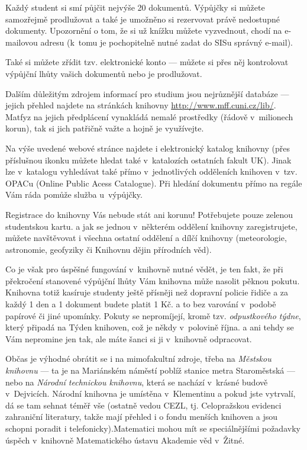 Každý student si smí půjčit nejvýše 20 dokumentů. Výpůjčky si
můžete samozřejmě prodlužovat a také je umožněno si rezervovat
právě nedostupné dokumenty. Upozornění o tom, že si už knížku
můžete vyzvednout, chodí na e-mailovou adresu (k~tomu je
pochopitelně nutné zadat do SISu správný e-mail).

Také si můžete zřídit tzv. elektronické konto --- můžete si přes
něj kontrolovat výpůjční lhůty vašich dokumentů nebo je
prodlužovat.

Dalším důležitým zdrojem informací pro studium jsou nejrůznější
databáze --- jejich přehled najdete na stránkách knihovny \url{http://www.mff.cuni.cz/lib/}. Matfyz na jejich předplácení
vynakládá nemalé prostředky (řádově v~milionech korun), tak si
jich patřičně važte a hojně je využívejte.

Na výše uvedené webové stránce najdete i elektronický katalog
knihovny (přes příslušnou ikonku můžete hledat také v~katalozích
ostatních fakult UK). Jinak lze v~katalogu vyhledávat také přímo
v~jednotlivých odděleních knihoven v~tzv. OPACu (Online Public Acess
Catalogue). Při hledání dokumentu přímo na regále Vám ráda pomůže
služba u~výpůjčky.

Registrace do knihovny Vás nebude stát ani korunu! Potřebujete
pouze zelenou studentskou kartu. a jak se jednou v~některém
oddělení knihovny zaregistrujete, můžete navštěvovat i všechna
ostatní oddělení a dílčí knihovny (meteorologie, astronomie,
geofyziky či Knihovnu dějin přírodních věd).

Co je však pro úspěšné fungování v~knihovně nutné vědět, je ten
fakt, že při překročení stanovené výpůjční lhůty Vám knihovna může
nasolit pěknou pokutu. Knihovna totiž kasíruje studenty ještě
přísněji než dopravní policie řidiče a za každý 1 den a 1 dokument
budete platit 1 Kč. a to bez varování v~podobě papírové či jiné
upomínky. Pokuty se nepromíjejí, kromě tzv. {\it odpustkového
týdne}, který připadá na Týden knihoven, což je někdy v~polovině
října. a ani tehdy se Vám nepromine jen tak, ale máte šanci si ji
v~knihovně odpracovat.


Občas je výhodné obrátit se i na mimofakultní zdroje, třeba na
{\it Městskou knihovnu} --- ta je na Mariánském náměstí poblíž
stanice metra Staroměstská --- nebo na {\it Národní technickou
knihovnu}, která se nachází v~krásné budově v~Dejvicích. {Národní
knihovna} je umístěna v~Klementinu a pokud jste vytrvalí, dá se
tam sehnat téměř vše (ostatně vedou CEZL, tj. Celopražskou
evidenci zahraniční literatury, takže mají přehled i o fondu
menších knihoven a jsou schopni poradit i telefonicky).Matematici
mohou mít se speciálnějšími požadavky úspěch v~knihovně
Matematického ústavu Akademie věd v~Žitné.
